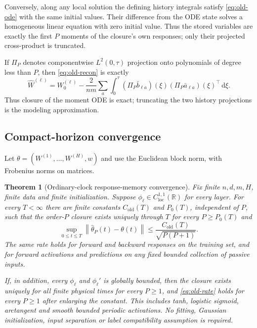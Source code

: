 \documentclass[11pt]{article}
\newtheorem{theorem}{Theorem}[section]
\theoremstyle{definition}
\theoremstyle{remark}
\newcommand{\R}{\mathbb{R}}
\newcommand{\norm}[1]{\left\lVert #1\right\rVert}
\newcommand{\dd}{\,\mathrm{d}}
\begin{document}
Conversely, along any local solution the defining history integrals satisfy
\eqref{eq:old-ode} with the same initial values.  Their difference from the
ODE state solves a homogeneous linear equation with zero initial value.
Thus the stored variables are exactly the first $P$ moments of the closure's
own responses; only their projected cross-product is truncated.

If $\Pi_P$ denotes componentwise $L^2(0,\tau)$ projection onto polynomials of
degree less than $P$, then \eqref{eq:old-recon} is exactly
\begin{equation}
 \widehat W^{(\ell)}=W_0^{(\ell)}-\frac{2}{nm}\sum_a
 \int_0^\tau(\Pi_P\bar b_{\ell a})(\xi)
 (\Pi_P\bar a_{\ell a})(\xi)^\top\dd\xi.            \label{eq:projection-form}
\end{equation}
Thus closure of the moment ODE is exact; truncating the two history projections
is the modeling approximation.

\subsection{Compact-horizon convergence}

Let $\theta=(W^{(1)},\ldots,W^{(H)},w)$ and use the Euclidean block norm, with
Frobenius norms on matrices.

\begin{theorem}[Ordinary-clock response-memory convergence]
\label{thm:old}
Fix finite $n,d,m,H$, finite data and finite initialization.  Suppose
$\phi_\ell\in C^{1,1}_{\mathrm{loc}}(\R)$ for every layer.  For every
$T<\infty$ there are finite constants $C_{\mathrm{old}}(T)$ and $P_0(T)$,
independent of $P$, such that the order-$P$ closure exists uniquely through
$T$ for every $P\ge P_0(T)$ and
\begin{equation}
 \sup_{0\le t\le T}\norm{\widehat\theta_P(t)-\theta(t)}
 \le \frac{C_{\mathrm{old}}(T)}{\sqrt{P(P+1)}}.       \label{eq:old-rate}
\end{equation}
The same rate holds for forward and backward responses on the training set,
and for forward activations and predictions on any fixed bounded collection
of passive inputs.

If, in addition, every $\phi_\ell$ and $\phi_\ell'$ is globally bounded, then
the closure exists uniquely for all finite physical times for every $P\ge1$,
and \eqref{eq:old-rate} holds for every $P\ge1$ after enlarging the constant.
This includes tanh, logistic sigmoid, arctangent and smooth bounded periodic
activations.  No fitting, Gaussian initialization, input separation or label
compatibility assumption is required.
\end{theorem}
\end{document}

